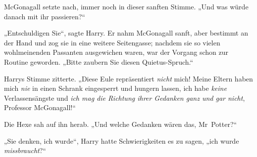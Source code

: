 McGonagall setzte nach, immer noch in dieser sanften Stimme. „Und was würde danach mit ihr passieren?“

„Entschuldigen Sie“, sagte Harry. Er nahm McGonagall sanft, aber bestimmt an der Hand und zog sie in eine weitere Seitengasse; nachdem sie so vielen wohlmeinenden Passanten ausgewichen waren, war der Vorgang schon zur Routine geworden. „Bitte zaubern Sie diesen Quietus-Spruch.“


Harrys Stimme zitterte. „Diese Eule repräsentiert \emph{nicht} mich! Meine Eltern haben mich \emph{nie} in einen Schrank eingesperrt und hungern lassen, ich habe \emph{keine} Verlassensängste und \emph{ich mag die Richtung ihrer Gedanken ganz und gar nicht}, Professor McGonagall!“

Die Hexe sah auf ihn herab. „Und welche Gedanken wären das, Mr~Potter?“

„Sie denken, ich wurde“, Harry hatte Schwierigkeiten es zu sagen, „ich wurde \emph{missbraucht}?“

